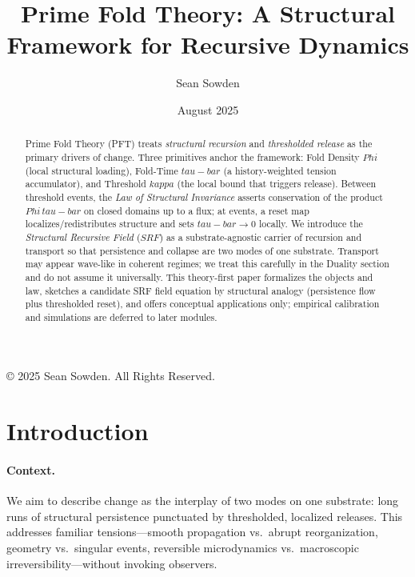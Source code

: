 \documentclass[12pt]{article}
\title{Prime Fold Theory: A Structural Framework for Recursive Dynamics}
\author{Sean Sowden}
\date{August 2025}
\newcommand{\FoldDensity}{\Phi}
\newcommand{\FoldTime}{\bar{\tau}}
\newcommand{\Threshold}{\kappa}
\newcommand{\SRF}{\mathcal{F}_{\mathrm{SR}}}
\def\FoldDensity{Phi}%
\def\FoldTime{tau-bar}%
\def\Threshold{kappa}%
\def\SRF{SRF}%
\def\bar#1{#1}%
\def\mathcal#1{#1}%
\def\mathrm#1{#1}%
\begin{document}
\maketitle
\begin{center}
  \begingroup\small
  \noindent © 2025 Sean Sowden. All Rights Reserved.
  \par\endgroup
\end{center}


\begin{abstract}
Prime Fold Theory (PFT) treats \emph{structural recursion} and \emph{thresholded release} as the primary drivers of change. Three primitives anchor the framework: Fold Density $\FoldDensity$ (local structural loading), Fold-Time $\FoldTime$ (a history-weighted tension accumulator), and Threshold $\Threshold$ (the local bound that triggers release). Between threshold events, the \emph{Law of Structural Invariance} asserts conservation of the product $\FoldDensity\,\FoldTime$ on closed domains up to a flux; at events, a reset map localizes/redistributes structure and sets $\FoldTime\!\to\!0$ locally. We introduce the \emph{Structural Recursive Field} ($\SRF$) as a substrate-agnostic carrier of recursion and transport so that persistence and collapse are two modes of one substrate. Transport may appear wave-like in coherent regimes; we treat this carefully in the Duality section and do not assume it universally. This theory-first paper formalizes the objects and law, sketches a candidate SRF field equation by structural analogy (persistence flow plus thresholded reset), and offers conceptual applications only; empirical calibration and simulations are deferred to later modules.
\end{abstract}

\tableofcontents

\section{Introduction}

\paragraph{Context.}
We aim to describe change as the interplay of two modes on one substrate: long runs of structural persistence punctuated by thresholded, localized releases. This addresses familiar tensions—smooth propagation vs.\ abrupt reorganization, geometry vs.\ singular events, reversible microdynamics vs.\ macroscopic irreversibility—without invoking observers.
\end{document}
